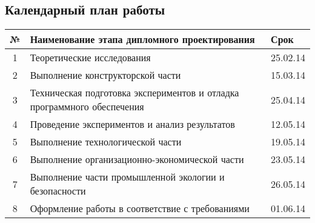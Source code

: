 \subsection{Календарный план работы}

\begin{table}[ht!]
    \begin{tabular}{|c|l|l|}
    \hline
    \textbf{№} & \textbf{Наименование этапа дипломного проектирования}          & \textbf{Срок}\\ \hline
    1 & Теоретические исследования                                              & 25.02.14  \\ \hline
    2 & Выполнение конструкторской части                                        & 15.03.14  \\ \hline
    3 & Техническая подготовка экспериментов и отладка программного обеспечения & 25.04.14  \\ \hline
    4 & Проведение экспериментов и анализ результатов                           & 12.05.14  \\ \hline
    5 & Выполнение технологической части                                        & 19.05.14  \\ \hline
    6 & Выполнение организационно-экономической части                           & 23.05.14  \\ \hline
    7 & Выполнение части промышленной экологии и безопасности                   & 26.05.14  \\ \hline
    8 & Оформление работы в соответствие с требованиями                         & 01.06.14  \\ \hline
    \end{tabular}
\end{table}

